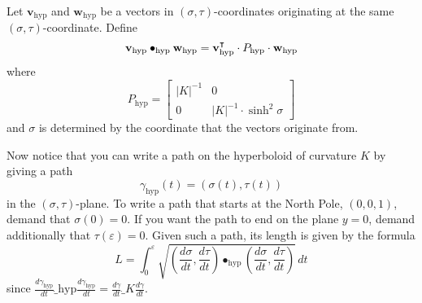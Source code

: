 \documentclass[handout,newpage,hints,,12pt,noauthor,nooutcomes]{ximera}
\begin{document}
\begin{definition}
  Let $\mathbf{v}_\mathrm{hyp}$ and $\mathbf{w}_\mathrm{hyp}$ be a vectors in
  $(\sigma,\tau)$-coordinates originating at the same
  $(\sigma,\tau)$-coordinate. Define
  \[
  \mathbf{v}_\mathrm{hyp} \bullet_\mathrm{hyp} \mathbf{w}_\mathrm{hyp} = \mathbf{v}_\mathrm{hyp}^\intercal \cdot P_\mathrm{hyp} \cdot \mathbf{w}_\mathrm{hyp}
  \]
  where
  \[
     P_\mathrm{hyp} =
  \begin{bmatrix}
    |K|^{-1} & 0 \\
    0 & |K|^{-1}\cdot\sinh^2 \sigma
  \end{bmatrix}
  \]
  and $\sigma$ is determined by the coordinate that the vectors
  originate from.
\end{definition}




Now notice that you can write a path on the hyperboloid of curvature
$K$ by giving a path
\[
\gamma_\mathrm{hyp}(t) = \left( \sigma(t),\tau(t)\right)
\]
in the $(\sigma,\tau)$-plane.  To write a path that starts at the
North Pole, $(0,0,1)$, demand that $\sigma(0)=0$.  If you want the path
to end on the plane $y=0$, demand additionally that
$\tau(\varepsilon)=0$. Given such a path, its length is given by the formula%
\[
L=\int_{0}^\varepsilon \sqrt{\left(\frac{d\sigma}{dt},\frac{d\tau}{dt}\right)
  \bullet_\mathrm{hyp} \left(\frac{d\sigma}{dt},\frac{d\tau}{dt}\right)}\, dt
 \]
 since $\frac{d\gamma_\mathrm{hyp}}{d t} \dot_\mathrm{hyp} \frac{d\gamma_\mathrm{hyp}}{d t}
 = \frac{d\gamma}{d t} \dot_K \frac{d\gamma}{d t}$.
\end{document}
